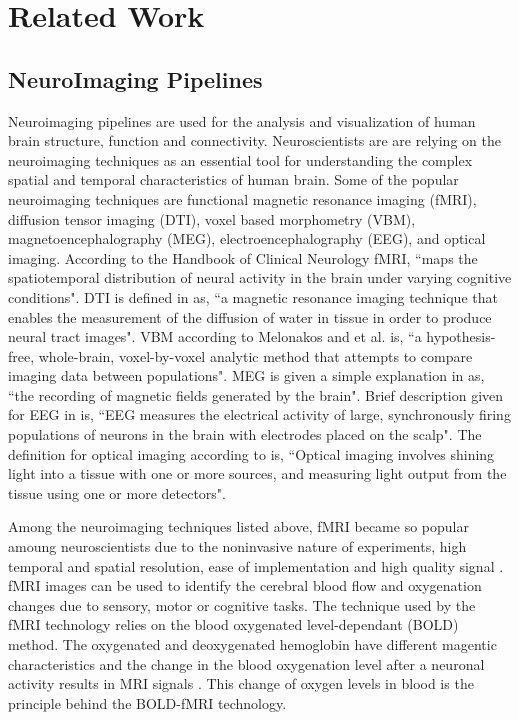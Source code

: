 \chapter{Related Work}
\section{NeuroImaging Pipelines}
Neuroimaging pipelines are used for the analysis and visualization of human brain structure, function and connectivity. Neuroscientists are are relying on the neuroimaging techniques as an essential tool for understanding the complex spatial and temporal characteristics of human brain. Some of the popular neuroimaging techniques are functional magnetic resonance imaging (fMRI), diffusion tensor imaging (DTI), voxel based morphometry (VBM), magnetoencephalography (MEG), electroencephalography (EEG), and optical imaging. According  to the Handbook of Clinical Neurology \cite{BUCHBINDER201661} fMRI, ``maps the spatiotemporal distribution of neural activity in the brain under varying cognitive conditions". DTI is defined in \cite{Rizea11} as, ``a magnetic resonance imaging technique that enables the measurement of the diffusion of water in tissue in order to produce neural tract images". VBM according to Melonakos and et al. \cite{MELONAKOS201165} is, ``a hypothesis-free, whole-brain, voxel-by-voxel analytic method that attempts to compare imaging data between populations". MEG is given a simple explanation in \cite{Sato1985} as, ``the recording of magnetic fields generated by the brain". Brief description given for EEG in \cite{Light2010} is, ``EEG measures the electrical activity of large, synchronously firing populations of neurons in the brain with electrodes placed on the scalp". The definition for optical imaging according to \cite{doi:10.1080/23273798.2017.1290810} is, ``Optical imaging involves shining light into a tissue with one or more sources, and measuring light output from the tissue using one or more detectors".

Among the neuroimaging techniques listed above, fMRI became so popular amoung neuroscientists due to the noninvasive nature of experiments, high temporal and spatial resolution, ease of implementation and high quality signal \cite{Bandettini2009}. fMRI images can be used to identify the cerebral blood flow and oxygenation changes due to sensory, motor or cognitive tasks. The technique used by the fMRI technology relies on the blood oxygenated level-dependant (BOLD) method. The oxygenated and deoxygenated hemoglobin have different magentic characteristics and the change in the blood oxygenation level after a neuronal activity results in MRI signals \cite{doi:10.1177/0883073807313047}. This change of oxygen levels in blood is the principle behind the BOLD-fMRI technology.

